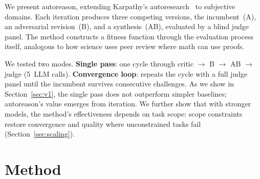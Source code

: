 \documentclass[10pt,twocolumn]{article}
\begin{document}
We present autoreason, extending Karpathy's autoresearch~\cite{autoresearch} to subjective domains. Each iteration produces three competing versions, the incumbent~(A), an adversarial revision~(B), and a synthesis~(AB), evaluated by a blind judge panel. The method constructs a fitness function through the evaluation process itself, analogous to how science uses peer review where math can use proofs.

We tested two modes. \textbf{Single pass}: one cycle through critic $\to$ B $\to$ AB $\to$ judge (5~LLM calls). \textbf{Convergence loop}: repeats the cycle with a full judge panel until the incumbent survives consecutive challenges. As we show in Section~\ref{sec:v1}, the single pass does not outperform simpler baselines; autoreason's value emerges from iteration. We further show that with stronger models, the method's effectiveness depends on task scope: scope constraints restore convergence and quality where unconstrained tasks fail (Section~\ref{sec:scaling}).

\section{Method}
\end{document}
